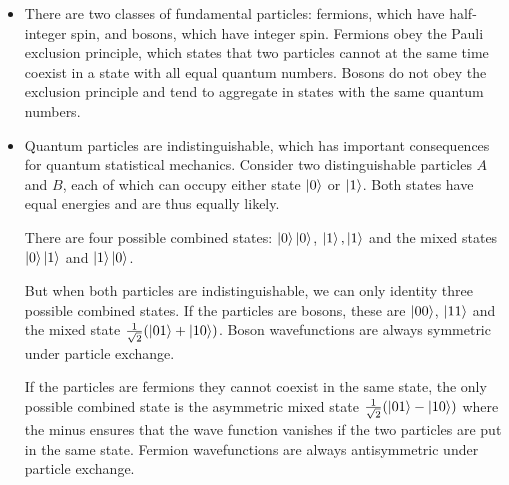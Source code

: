 \documentclass[11pt, a4paper]{article}
\begin{document}
\begin{itemize}

	\iffalse
	\item Consider a system of $ N $ independent quantum particles with wave functions $ \psi_{1}(\bm{q}_{1}), \ldots,  \psi_{N}(\bm{q}_{N}) $. Because the particles are independent, the wave function for the entire system can be written as the product
	\begin{equation*}
		\psi(\bm{q}_{1}, \ldots, \bm{q}_{N}) = \psi_{1}(\bm{q}_{1}) \cdot \psi_{2}(\bm{q}_{2}) \cdot \cdots  \cdot \psi_{N}(\bm{q}_{N})
	\end{equation*}
	\fi
	\item There are two classes of fundamental particles: fermions, which have half-integer spin, and bosons, which have integer spin. Fermions obey the Pauli exclusion principle, which states that two particles cannot at the same time coexist in a state with all equal quantum numbers. Bosons do not obey the exclusion principle and tend to aggregate in states with the same quantum numbers.
	
	\item Quantum particles are indistinguishable, which has important consequences for quantum statistical mechanics. Consider two distinguishable particles $ A $ and $ B $, each of which can occupy either state $ \ket{0} $ or $ \ket{1} $. Both states have equal energies and are thus equally likely.
	
	There are four possible combined states: $ \ket{0} \ket{0} $, $ \ket{1}, \ket{1} $ and the mixed states $ \ket{0}\ket{1} $ and $ \ket{1}\ket{0} $.  
	
	But when both particles are indistinguishable, we can only identity three possible combined states. If the particles are bosons, these are $  \ket{00} $, $ \ket{11} $ and the mixed state $ \frac{1}{\sqrt{2}}(\ket{01} + \ket{10}) $. Boson wavefunctions are always symmetric under particle exchange.
	
	If the particles are fermions they cannot coexist in the same state, the only possible combined state
	is the asymmetric mixed state $ \frac{1}{\sqrt{2}}(\ket{01} - \ket{10}) $ where the minus ensures that the wave function vanishes if the two particles are put in the same state. Fermion wavefunctions are always antisymmetric under particle exchange.
	

\end{itemize}
\end{document}
